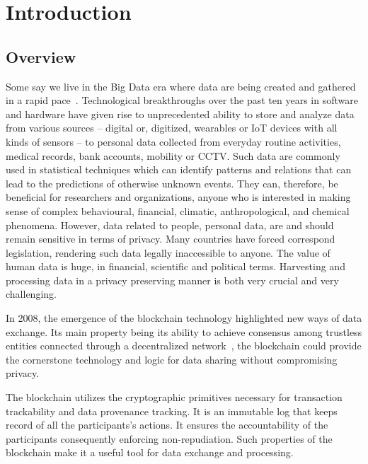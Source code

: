 \chapter{Introduction}
\label{introduction}

\section{Overview}
\label{introduction:overview}

Some say we live in the Big Data era where data are being created and gathered in a rapid pace~\cite{10.1109/SPW.2015.27}. Technological breakthroughs over the past ten years in software and hardware have given rise to unprecedented ability to store and analyze data from various sources -- digital or, digitized, wearables or IoT devices with all kinds of sensors -- to personal data collected from everyday routine activities, medical records, bank accounts, mobility or CCTV. Such data are commonly used in statistical techniques which can identify patterns and relations that can  lead to the predictions of otherwise unknown events. They can, therefore, be beneficial for researchers and organizations, anyone who is interested in making sense of complex behavioural, financial, climatic, anthropological, and chemical phenomena. However, data related to people, personal data, are and should remain sensitive in terms of privacy. Many countries have forced correspond legislation, rendering such data legally inaccessible to anyone. The value of human data is huge, in financial, scientific and political terms. Harvesting and processing data in a privacy preserving manner is both very crucial and very challenging.

In 2008, the emergence of the blockchain technology highlighted new ways of data exchange. Its main property being its ability to achieve consensus among trustless entities connected through a decentralized network~\cite{10.1007/978-3-662-46803-6_10}, the blockchain could provide the cornerstone technology and logic for data sharing without compromising privacy.

The blockchain utilizes the cryptographic primitives necessary for transaction trackability and data provenance tracking. It is an immutable log that keeps record of all the participants's actions. It ensures the accountability of the participants consequently enforcing non-repudiation. Such properties of the blockchain make it a useful tool for data exchange and processing.

